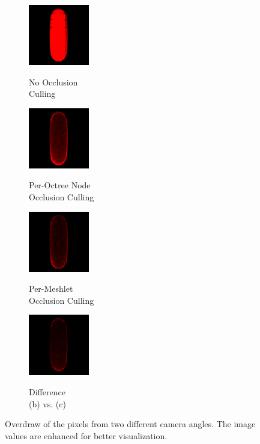 \begin{figure}[!htbp]
  \begin{subfigure}{100px}
    \includegraphics[height=100px]{images/graphics/overdraw-torus2-nocull.png}
    \caption{}
    \parbox{\linewidth}{\centering\footnotesize No Occlusion\\Culling}
  \end{subfigure}
  \begin{subfigure}{100px}
    \includegraphics[height=100px]{images/graphics/overdraw-torus2-pooc.png}
    \caption{}
    \parbox{\linewidth}{\centering\footnotesize Per-Octree Node\\Occlusion Culling}
  \end{subfigure}
  \begin{subfigure}{100px}
    \includegraphics[height=100px]{images/graphics/overdraw-torus2-pmoc.png}
    \caption{}
    \parbox{\linewidth}{\centering\footnotesize Per-Meshlet\\Occlusion Culling}
  \end{subfigure}
  \begin{subfigure}{100px}
    \includegraphics[height=100px]{images/graphics/overdraw-torus2-diff.png}
    \caption{}
    \parbox{\linewidth}{\centering\footnotesize Difference\\(b) vs. (c)}
  \end{subfigure}

  \caption{Overdraw of the pixels from two different camera angles. 
  The image values are enhanced for better visualization.}
  \label{fig:torus-overdraw}
\end{figure}

